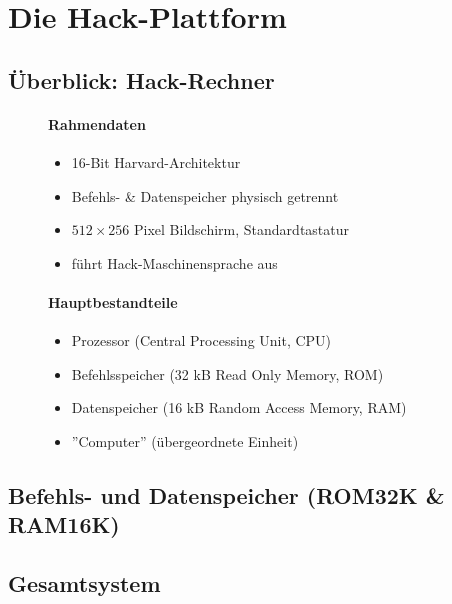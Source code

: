 \documentclass[12pt]{report}
\begin{document}
\section{Die Hack-Plattform}
\subsection{Überblick: Hack-Rechner}
\begin{figure}[H]
  \begin{minipage}[t]{0.45\textwidth}
    \paragraph{Rahmendaten}
    \begin{itemize}
      \item 16-Bit Harvard-Architektur
      \item Befehls- \& Datenspeicher physisch getrennt
      \item $512 \times 256$ Pixel Bildschirm, Standardtastatur
      \item führt Hack-Maschinensprache aus
    \end{itemize}
  \end{minipage}
  \hfill
  \begin{minipage}[t]{0.45\textwidth}
    \paragraph{Hauptbestandteile}
    \begin{itemize}
      \item Prozessor (Central Processing Unit, CPU)
      \item Befehlsspeicher (32 kB Read Only Memory, ROM)
      \item Datenspeicher (16 kB Random Access Memory, RAM)
      \item ''Computer'' (übergeordnete Einheit)
    \end{itemize}
  \end{minipage}
\end{figure}


\subsection{Befehls- und Datenspeicher (ROM32K \& RAM16K)}
\subsection{Gesamtsystem}
\end{document}
